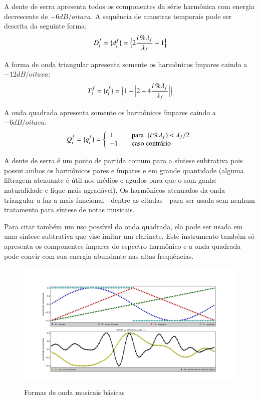 A dente de serra apresenta todos os componentes da série
harmônica com energia decrescente de $-6dB/oitava$. A sequência de amostras temporais pode ser descrita da seguinte forma:
\begin{equation}\label{denteDeSerra}
     D^f_i=\{ d^f_i \}=\Bigl\{ 2\frac{i\,\%\lambda_f}{\lambda_f} -1 \Bigr\}
\end{equation}

A forma de onda triangular apresenta somente os harmônicos ímpares caindo a $-12dB/oitava$:
\begin{equation}\label{triangular}
     T^f_i=\{ t^f_i \}=\Bigl\{1- \Bigl| 2 - 4\frac{i\,\%\lambda_f}{\lambda_f} \Bigr| \Bigr\}
\end{equation}

A onda quadrada apresenta somente os harmônicos ímpares caindo a $-6dB/oitava$:
\begin{equation}\label{quadrada}
     Q^f_i=\{ q^f_i \}= \left\{
         \begin{array}{l l}
              1 & \quad \text{para} \; \; (i\,\%\lambda_f)   <  \lambda_f /2  \\
              -1 & \quad \text{caso contrário}\\
         \end{array} \right.
\end{equation}

A dente de serra é um ponto de partida comum para a síntese subtrativa pois possui
ambos os harmônicos pares e ímpares e em grande quantidade (alguma filtragem atenuante
é útil nos médios e agudos para que o som ganhe naturalidade e fique mais agradável).
Os harmônicos atenuados da onda triangular
a faz a mais funcional - dentre as citadas - para ser usada sem nenhum tratamento para síntese de notas musicais.

Para citar também um uso possível da onda quadrada, ela pode ser usada em uma síntese
subtrativa que vise imitar um clarinete. Este instrumento também só apresenta os
componentes ímpares do espectro harmônico e a onda quadrada pode convir com sua energia abundante nas altas frequências.



\begin{figure}[h!]
    \centering
    \caption{Formas de onda musicais básicas}
        \includegraphics[width=\textwidth]{figuras/formasDeOnda5}
        \label{fig:formasDeOnda}
\end{figure}



